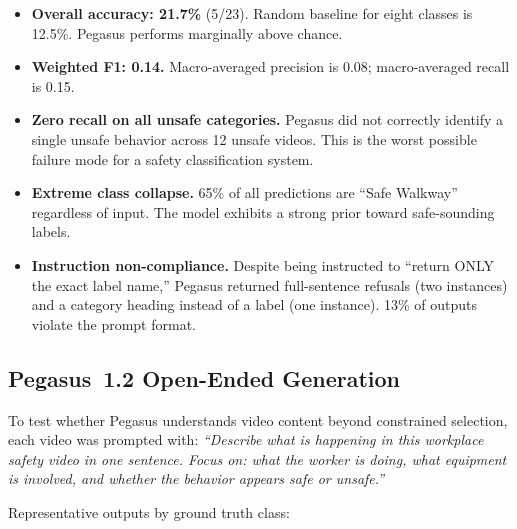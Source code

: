 \documentclass[11pt,a4paper]{article}
\begin{document}
\begin{itemize}
    \item \textbf{Overall accuracy: 21.7\%} (5/23). Random baseline for eight classes is 12.5\%. Pegasus performs marginally above chance.
    \item \textbf{Weighted F1: 0.14.} Macro-averaged precision is 0.08; macro-averaged recall is 0.15.
    \item \textbf{Zero recall on all unsafe categories.} Pegasus did not correctly identify a single unsafe behavior across 12 unsafe videos. This is the worst possible failure mode for a safety classification system.
    \item \textbf{Extreme class collapse.} 65\% of all predictions are ``Safe Walkway'' regardless of input. The model exhibits a strong prior toward safe-sounding labels.
    \item \textbf{Instruction non-compliance.} Despite being instructed to ``return ONLY the exact label name,'' Pegasus returned full-sentence refusals (two instances) and a category heading instead of a label (one instance). 13\% of outputs violate the prompt format.
\end{itemize}

\subsection{Pegasus~1.2 Open-Ended Generation}

To test whether Pegasus understands video content beyond constrained selection, each video was prompted with: \textit{``Describe what is happening in this workplace safety video in one sentence. Focus on: what the worker is doing, what equipment is involved, and whether the behavior appears safe or unsafe.''}

Representative outputs by ground truth class:
\end{document}
